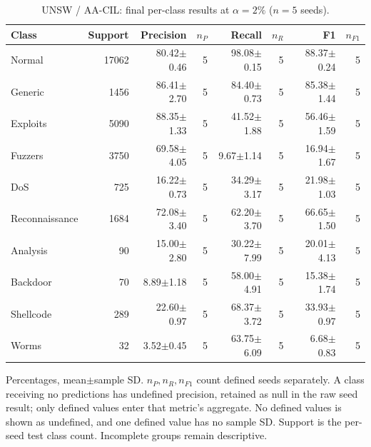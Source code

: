 \begin{table}[t]
\centering\scriptsize
\setlength{\tabcolsep}{3.3pt}
\caption{UNSW / AA-CIL: final per-class results at $\alpha=2\%$ ($n=5$ seeds).}\label{tab:forgetting-class-unsw_nb15-aacil}
\begin{tabular}{lrrrrrrr}
\toprule
Class & Support & Precision & $n_P$ & Recall & $n_R$ & F1 & $n_{F1}$ \\
\midrule
Normal & 17062 & 80.42$\pm$0.46 & 5 & 98.08$\pm$0.15 & 5 & 88.37$\pm$0.24 & 5 \\
Generic & 1456 & 86.41$\pm$2.70 & 5 & 84.40$\pm$0.73 & 5 & 85.38$\pm$1.44 & 5 \\
Exploits & 5090 & 88.35$\pm$1.33 & 5 & 41.52$\pm$1.88 & 5 & 56.46$\pm$1.59 & 5 \\
Fuzzers & 3750 & 69.58$\pm$4.05 & 5 & 9.67$\pm$1.14 & 5 & 16.94$\pm$1.67 & 5 \\
DoS & 725 & 16.22$\pm$0.73 & 5 & 34.29$\pm$3.17 & 5 & 21.98$\pm$1.03 & 5 \\
Reconnaissance & 1684 & 72.08$\pm$3.40 & 5 & 62.20$\pm$3.70 & 5 & 66.65$\pm$1.50 & 5 \\
Analysis & 90 & 15.00$\pm$2.80 & 5 & 30.22$\pm$7.99 & 5 & 20.01$\pm$4.13 & 5 \\
Backdoor & 70 & 8.89$\pm$1.18 & 5 & 58.00$\pm$4.91 & 5 & 15.38$\pm$1.74 & 5 \\
Shellcode & 289 & 22.60$\pm$0.97 & 5 & 68.37$\pm$3.72 & 5 & 33.93$\pm$0.97 & 5 \\
Worms & 32 & 3.52$\pm$0.45 & 5 & 63.75$\pm$6.09 & 5 & 6.68$\pm$0.83 & 5 \\
\bottomrule
\end{tabular}
\par\smallskip\begin{minipage}{0.98\textwidth}\scriptsize Percentages, mean$\pm$sample SD. $n_P,n_R,n_{F1}$ count defined seeds separately. A class receiving no predictions has undefined precision, retained as null in the raw seed result; only defined values enter that metric's aggregate. No defined values is shown as undefined, and one defined value has no sample SD. Support is the per-seed test class count. Incomplete groups remain descriptive.\end{minipage}
\end{table}

